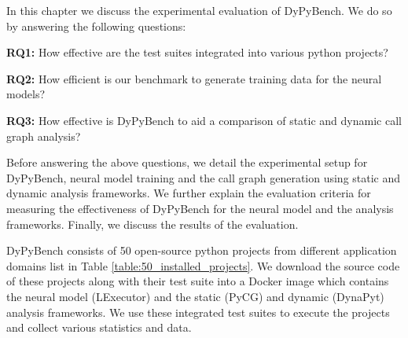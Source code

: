 In this chapter we discuss the experimental evaluation of DyPyBench. We do so by answering the following questions:

\textbf{RQ1:} How effective are the test suites integrated into various python projects?

\textbf{RQ2:} How efficient is our benchmark to generate training data for the neural models?

\textbf{RQ3:} How effective is DyPyBench to aid a comparison of static and dynamic call graph analysis?

Before answering the above questions, we detail the experimental setup for DyPyBench, neural model training and the call graph generation using static and dynamic analysis frameworks.
We further explain the evaluation criteria for measuring the effectiveness of DyPyBench for the neural model and the analysis frameworks.
Finally, we discuss the results of the evaluation.

DyPyBench consists of 50 open-source python projects from different application domains list in Table \ref{table:50_installed_projects}.
We download the source code of these projects along with their test suite into a Docker image which contains the neural model (LExecutor) and the static (PyCG) and dynamic (DynaPyt) analysis frameworks.
We use these integrated test suites to execute the projects and collect various statistics and data.

